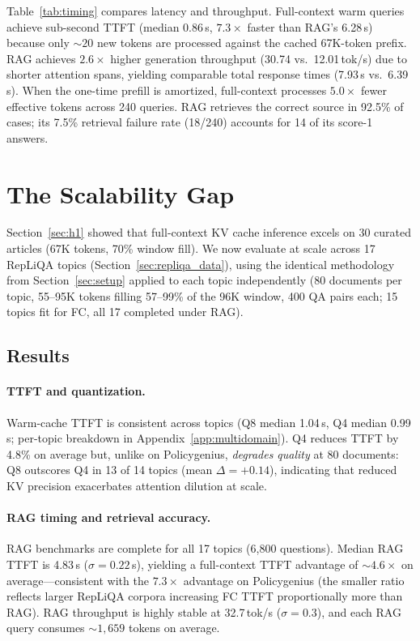 \documentclass{article}
\begin{document}
Table~\ref{tab:timing} compares latency and throughput.
Full-context warm queries achieve sub-second TTFT (median 0.86\,s,
$7.3\times$ faster than RAG's 6.28\,s) because only ${\sim}20$ new tokens
are processed against the cached 67K-token prefix. RAG achieves $2.6\times$
higher generation throughput (30.74 vs.\ 12.01\,tok/s) due to shorter
attention spans, yielding comparable total response times (7.93\,s vs.\
6.39\,s). When the one-time prefill is amortized, full-context processes
$5.0\times$ fewer effective tokens across 240 queries. RAG retrieves the
correct source in 92.5\% of cases; its 7.5\% retrieval failure rate (18/240)
accounts for 14 of its score-1 answers.

\section{The Scalability Gap}
\label{sec:repliqa}

Section~\ref{sec:h1} showed that full-context KV cache inference excels
on 30 curated articles (67K tokens, 70\% window fill). We now evaluate at
scale across 17 RepLiQA topics (Section~\ref{sec:repliqa_data}), using
the identical methodology from Section~\ref{sec:setup} applied to each
topic independently (80 documents per topic, 55--95K tokens filling
57--99\% of the 96K window, 400 QA pairs each; 15 topics fit for FC, all
17 completed under RAG).

\subsection{Results}

\paragraph{TTFT and quantization.}
Warm-cache TTFT is consistent across topics (Q8 median 1.04\,s, Q4 median
0.99\,s; per-topic breakdown in Appendix~\ref{app:multidomain}).
Q4 reduces TTFT by 4.8\% on average but, unlike on Policygenius, \emph{degrades
quality} at 80 documents: Q8 outscores Q4 in 13 of 14 topics (mean
$\Delta = +0.14$), indicating that reduced KV precision exacerbates
attention dilution at scale.

\paragraph{RAG timing and retrieval accuracy.}
RAG benchmarks are complete for all 17 topics (6,800 questions).
Median RAG TTFT is 4.83\,s ($\sigma=0.22$\,s), yielding a full-context
TTFT advantage of ${\sim}4.6\times$ on average---consistent with the
$7.3\times$ advantage on Policygenius (the smaller ratio reflects larger
RepLiQA corpora increasing FC TTFT proportionally more than RAG).
RAG throughput is highly stable at 32.7\,tok/s ($\sigma=0.3$), and
each RAG query consumes ${\sim}1{,}659$ tokens on average.
\end{document}
